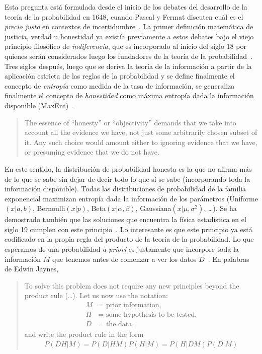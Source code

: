 \documentclass[a4paper,11pt]{book}
\theoremstyle{definition}
\begin{document}
Esta pregunta est\'a formulada desde el inicio de los debates del desarrollo de la teor\'ia de la probabilidad en 1648, cuando Pascal y Fermat discuten cu\'al es el \emph{precio justo} en contextos de incertidumbre~\cite{Devlin2008}.
%
La primer definici\'on matem\'atica de justicia, verdad u honestidad ya exist\'ia previamente a estos debates bajo el viejo principio filos\'ofico de \emph{indiferencia}, que es incorporado al inicio del siglo 18 por quienes ser\'an considerados luego los fundadores de la teor\'ia de la probabilidad~\cite{jaynes1984-bayesianBackground}.
%
Tres siglos despu\'es, luego que se deriva la teor\'ia de la informaci\'on a partir de la aplicaci\'on estricta de las reglas de la probabilidad y se define finalmente el concepto de \emph{entrop\'ia} como medida de la tasa de informaci\'on, se generaliza finalmente el concepto de \emph{honestidad} como m\'axima entrop\'ia dada la informaci\'on disponible (MaxEnt)~\cite{Jaynes2003}.
%
\begin{quotation}
The essence of ``honesty'' or ``objectivity'' demands that we take into account all the evidence we have, not just some arbitrarily chosen subset of it. Any such choice would amount either to ignoring evidence that we have, or presuming evidence that we do not have.
\end{quotation}
%
En este sentido, la distribuci\'on de probabilidad honesta es la que no afirma m\'as de lo que se sabe sin dejar de decir todo lo que s\'i se sabe (incorporando toda la informaci\'on disponible).
%
Todas las distribuciones de probabilidad de la familia exponencial maximizan entrop\'ia dada la informaci\'on de los par\'ametros (Uniforme$(x|a,b)$, Bernoulli$(x|p)$, Beta$(x|\alpha, \beta)$, Gaussiana$(x|\mu, \sigma^2)$, \dots).
%
Se ha demostrado tambi\'en que las soluciones que encuentra la f\'isica estad\'istica en el siglo 19 cumplen con este principio~\cite{jaynes1957-I, jaynes1957-II}.
%
Lo interesante es que este principio ya est\'a codificado en la propia regla del producto de la teor\'ia de la probabilidad.
%
Lo que esperamos de una probabilidad \emph{a priori} es justamente que incorpore toda la informaci\'on $M$ que tenemos antes de comenzar a ver los datos $D$~\cite{Jaynes2003}.
%
En palabras de Edwin Jaynes,
%
\begin{quotation}
To solve this problem does not require any new principles beyond the product rule (\dots). Let us now use the notation:
\begin{align*}
M &= \text{ prior information,} \\
H &= \text{ some hypothesis to be tested,} \\
D &= \text{ the data,}
\end{align*}
and write the product rule in the form
\begin{align}
P(DH|M) = P(D|HM)P(H|M) = P(H|DM)P(D|M)
\end{align}
\end{quotation}
\end{document}
